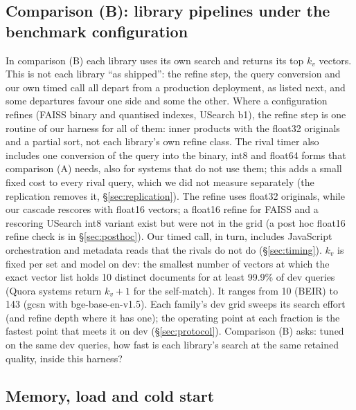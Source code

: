 \subsection{Comparison (B): library pipelines under the benchmark configuration}

In comparison (B) each library uses its own search and returns its top $k_v$ vectors. This is not each library ``as
shipped'': the refine step, the query conversion and our own timed call all depart from a production deployment, as
listed next, and some departures favour one side and some the other. Where a
configuration refines (FAISS binary and quantised indexes, USearch b1), the refine step is one routine
of our harness for all of them: inner products with the float32 originals and a partial sort, not each
library's own refine class. The rival timer also includes one conversion of the query into the binary,
int8 and float64 forms that comparison (A) needs, also for systems that do not use them; this adds a
small fixed cost to every rival query, which we did not measure separately (the replication removes it,
\S\ref{sec:replication}). The refine uses float32 originals, while our cascade rescores with float16 vectors; a float16
refine for FAISS and a rescoring USearch int8 variant exist but were not in the grid (a post hoc float16 refine check is in
\S\ref{sec:posthoc}). Our timed call, in turn, includes
JavaScript orchestration and metadata reads that the rivals do not do (\S\ref{sec:timing}). $k_v$ is fixed per set and model on dev: the smallest number of vectors at which the exact
vector list holds 10 distinct documents for at least 99.9\% of dev queries (Quora systems return
$k_v + 1$ for the self-match). It ranges from 10 (BEIR) to 143 (gcsn with bge-base-en-v1.5). Each family's dev grid sweeps its search effort
(and refine depth where it has one); the operating point at each fraction is the fastest point that
meets it on dev (\S\ref{sec:protocol}). Comparison (B) asks: tuned on the same dev queries, how fast is each
library's search at the same retained quality, inside this harness?

\subsection{Memory, load and cold start}

